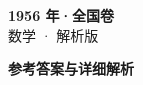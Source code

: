 \documentclass[zihao=-4, a4paper]{ctexart}
\begin{document}
\begin{center}
  {\Large\bfseries 1956 年·全国卷}\\[4pt]
  {\large 数学 · 解析版}
\end{center}
\medskip
{}

\clearpage
{}
\begin{center}{\Large\bfseries 参考答案与详细解析}\end{center}
\medskip

\end{document}
